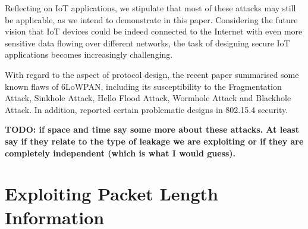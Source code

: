 \documentclass{article}
\begin{document}
Reflecting on IoT applications, we stipulate that most of these attacks may still be applicable, as we intend to demonstrate in this paper. Considering the future vision that IoT devices could be indeed connected to the Internet with even more sensitive data flowing over different networks, the task of designing secure IoT applications becomes increasingly challenging.

With regard to the aspect of protocol design, the recent paper \cite{6LoWPANAtk} summarised some known flaws of 6LoWPAN, including its susceptibility to the Fragmentation Attack\cite{FragAtk}, Sinkhole Attack\cite{Sinkhole}, Hello Flood Attack\cite{HelloFlood}, Wormhole Attack\cite{Wormhole} and Blackhole Attack\cite{Blackhole}. In addition, \cite{802154SecIssues} reported certain problematic designs in 802.15.4 security\cite{802154}.

\textbf{TODO: if space and time say some more about these attacks. At least say if they relate to the type of leakage we are exploiting or if they are completely independent (which is what I would guess). }



%	





\section{Exploiting Packet Length Information}
\end{document}
